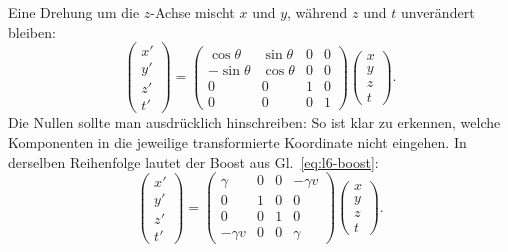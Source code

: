 \begin{classroomqa}
\end{classroomqa}

Eine Drehung um die \(z\)-Achse mischt \(x\) und \(y\), während \(z\) und \(t\) unverändert bleiben: \begin{equation}
\begin{pmatrix}
  x'\\ y'\\ z'\\ t'
\end{pmatrix}
=
\begin{pmatrix}
  \cos\theta & \sin\theta & 0 & 0\\
  -\sin\theta & \cos\theta & 0 & 0\\
  0 & 0 & 1 & 0\\
  0 & 0 & 0 & 1
\end{pmatrix}
\begin{pmatrix}
  x\\ y\\ z\\ t
\end{pmatrix}.
\end{equation} Die Nullen sollte man ausdrücklich hinschreiben: So ist klar zu erkennen, welche Komponenten in die jeweilige transformierte Koordinate nicht eingehen. In derselben Reihenfolge lautet der Boost aus Gl.~\eqref{eq:l6-boost}: \begin{equation}
\begin{pmatrix}
  x'\\ y'\\ z'\\ t'
\end{pmatrix}
=
\begin{pmatrix}
  \gamma & 0 & 0 & -\gamma v\\
  0 & 1 & 0 & 0\\
  0 & 0 & 1 & 0\\
  -\gamma v & 0 & 0 & \gamma
\end{pmatrix}
\begin{pmatrix}
  x\\ y\\ z\\ t
\end{pmatrix}.
\end{equation}

